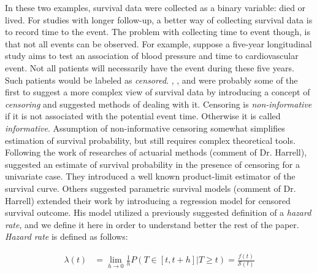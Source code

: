 \documentclass[]{article}
\begin{document}
In these two examples, survival data were collected as a binary variable: died or lived. For studies with longer follow-up, a better way of collecting survival data is to record time to the event. The problem with collecting time to event though, is that not all events can be observed. For example, suppose a five-year longitudinal study aims to test an association of blood pressure and time to cardiovascular event. Not all patients will necessarily have the event during these five years. Such patients would be labeled as \emph{censored}.  \cite{fisher1931truncated},  \cite{hald1949maximum}, and \cite{swan1969computing} were probably some of the first to suggest a more complex view of survival data by introducing a concept of \emph{censoring} and suggested methods of dealing with it. Censoring is \emph{non-informative} if it is not associated with the potential event time. Otherwise it is called \emph{informative}. Assumption of non-informative censoring somewhat simplifies estimation of survival probability, but still requires complex theoretical tools. Following the work of researches of actuarial methods (comment of Dr. Harrell), \cite{kaplan1958nonparametric} suggested an estimate of survival probability in the presence of censoring for a univariate case. They introduced a well known product-limit estimator of the survival curve. Others suggested parametric survival models (comment of Dr. Harrell) \cite{david1972regression} extended their work by introducing a regression model for censored survival outcome. His model utilized a previously suggested definition of a \emph{hazard rate}, and we define it here in order to understand better the rest of the paper. \emph{Hazard rate} is defined as follows:

$$
\begin{aligned}
	\lambda(t) &= \lim_{h\rightarrow 0} \frac{1}{h} P(T\in[t,t+h] | T\geq t)=
	             \frac{f(t)}{\mathcal{S}(t)}
\end{aligned}
$$
\end{document}
